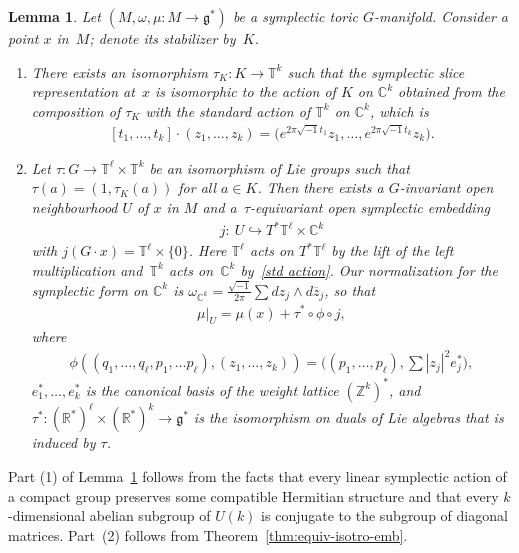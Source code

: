 \documentclass[pdftex]{sigma}
\numberwithin{equation}{section}
\newtheorem{Lemma}{Lemma}[section]
\begin{document}
\begin{Lemma}\label{lem:2.6}
Let $(M,\omega, \mu \colon M \to {\mathfrak g}^*)$ be a symplectic toric $G$-manifold.
Consider a point $x$ in~$M$; denote its stabilizer by~$K$.
\begin{enumerate}[$1.$]\itemsep=0pt
\item
There exists an isomorphism $\tau_K \colon K \to {\mathbb T}^k$
such that the symplectic slice representation at~$x$
is isomorphic to the action of $K$ on ${\mathbb C}^k$ obtained from
the composition of $\tau_K$
with the standard action of ${\mathbb T}^k$ on ${\mathbb C}^k$,
which is
\begin{gather} \label{std action}
[t_1,\ldots, t_k]\cdot (z_1,\ldots, z_k) =
\big(e^{2\pi\sqrt{-1} t_1} z_1,\ldots, e^{2\pi\sqrt{-1} t_k} z_k\big).
\end{gather}

\item
Let $\tau \colon G \to {\mathbb T}^\ell \times {\mathbb T}^k$ be an isomorphism
of Lie groups such that $\tau(a) = (1,\tau_K(a))$ for all $a \in K$.
Then there exists a $G$-invariant open neighbourhood $U$
of $x$ in $M$
and a~$\tau$-equivariant open symplectic embedding
\begin{gather*}
j \colon \ U \hookrightarrow T^*{\mathbb T}^\ell \times {\mathbb C}^k
\end{gather*}
with $j(G\cdot x) = {\mathbb T}^\ell \times \{0\}$.  Here ${\mathbb T}^\ell $ acts on $
T^*{\mathbb T}^\ell$ by the lift of the left multiplication
and~${\mathbb T}^k$ acts on~${\mathbb C}^k$ by~\eqref{std action}.
Our normalization for
the symplectic form on ${\mathbb C}^k$ is
$\omega_{{\mathbb C}^k} = \frac{\sqrt{-1}}{2\pi} \sum dz_j \wedge d\overline{z}_j$,
so that
\begin{gather} \label{moment}
\mu|_U = \mu(x) + \tau^* \circ \phi \circ j,
\end{gather}
where
\begin{gather*}
\phi ((q_1, \ldots, q_\ell, p_1, \ldots p_\ell), (z_1,\ldots, z_k))
=   \Big(   (p_1,\ldots, p_\ell)   ,   \sum |z_j|^2 e_j^*   \Big)  ,
\end{gather*}
$e_1^*,\ldots,e_k^*$ is the canonical basis
of the weight lattice $({\mathbb Z}^k)^*$,
and $\tau^* \colon ({\mathbb R}^*)^\ell \times ({\mathbb R}^*)^k \to {\mathfrak g}^*$
is the isomorphism on duals of Lie algebras that is induced by $\tau$.
\end{enumerate}
\end{Lemma}

Part (1) of Lemma~\ref{lem:2.6} follows from the facts that every
linear symplectic action of a compact group preserves some compatible
Hermitian structure and that every $k$-dimensional abelian subgroup of
$U(k)$ is conjugate to the subgroup of diagonal matrices.
Part~(2) follows from Theorem~\ref{thm:equiv-isotro-emb}.
\end{document}
